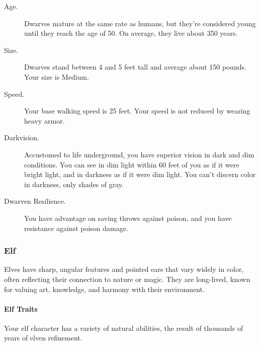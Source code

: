 \begin{description}
\item[Age.]
Dwarves mature at the same rate as humans, but they're considered young
until they reach the age of 50. On average, they live about 350 years.
\item[Size.]
Dwarves stand between 4 and 5 feet tall and average about 150 pounds.
Your size is Medium.
\item[Speed.]
Your base walking speed is 25 feet. Your speed is not reduced by wearing
heavy armor.
\item[Darkvision.]
Accustomed to life underground, you have superior vision in dark and dim
conditions. You can see in dim light within 60 feet of you as if it were
bright light, and in darkness as if it were dim light. You can't discern
color in darkness, only shades of gray.
\item[Dwarven Resilience.]
You have advantage on saving throws against poison, and you have
resistance against poison damage.
\end{description}

\subsubsection{Elf}\label{ancestry-elf}

Elves have sharp, angular features and pointed ears that vary widely in
color, often reflecting their connection to nature or magic. They are
long-lived, known for valuing art, knowledge, and harmony with their
environment.

\paragraph{Elf Traits}\label{_elf_traits}

Your elf character has a variety of natural abilities, the result of
thousands of years of elven refinement.

